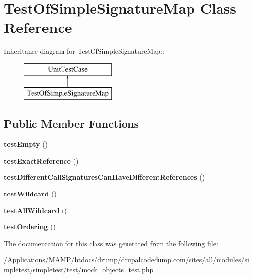 \hypertarget{class_test_of_simple_signature_map}{
\section{TestOfSimpleSignatureMap Class Reference}
\label{class_test_of_simple_signature_map}
}
Inheritance diagram for TestOfSimpleSignatureMap::\begin{figure}[H]
\begin{center}
\leavevmode
\includegraphics[height=2cm]{class_test_of_simple_signature_map}
\end{center}
\end{figure}
\subsection*{Public Member Functions}
\begin{DoxyCompactItemize}
\item 
\hypertarget{class_test_of_simple_signature_map_a51f366b88870a3ec517e83c1b76b60fe}{
{\bfseries testEmpty} ()}
\label{class_test_of_simple_signature_map_a51f366b88870a3ec517e83c1b76b60fe}

\item 
\hypertarget{class_test_of_simple_signature_map_aa0486f6c645d4cda2771e378b2431412}{
{\bfseries testExactReference} ()}
\label{class_test_of_simple_signature_map_aa0486f6c645d4cda2771e378b2431412}

\item 
\hypertarget{class_test_of_simple_signature_map_ac21f4b4dd184cb9ca0fba8a49a80705a}{
{\bfseries testDifferentCallSignaturesCanHaveDifferentReferences} ()}
\label{class_test_of_simple_signature_map_ac21f4b4dd184cb9ca0fba8a49a80705a}

\item 
\hypertarget{class_test_of_simple_signature_map_ac4fbb9e3a9291fc8489d219ddd846f35}{
{\bfseries testWildcard} ()}
\label{class_test_of_simple_signature_map_ac4fbb9e3a9291fc8489d219ddd846f35}

\item 
\hypertarget{class_test_of_simple_signature_map_abc8969aa62cf0683378322bbc581cfb1}{
{\bfseries testAllWildcard} ()}
\label{class_test_of_simple_signature_map_abc8969aa62cf0683378322bbc581cfb1}

\item 
\hypertarget{class_test_of_simple_signature_map_a482588716710b7e88bee4478196a1fb5}{
{\bfseries testOrdering} ()}
\label{class_test_of_simple_signature_map_a482588716710b7e88bee4478196a1fb5}

\end{DoxyCompactItemize}


The documentation for this class was generated from the following file:\begin{DoxyCompactItemize}
\item 
/Applications/MAMP/htdocs/drump/drupalcodedump.com/sites/all/modules/simpletest/simpletest/test/mock\_\-objects\_\-test.php\end{DoxyCompactItemize}
